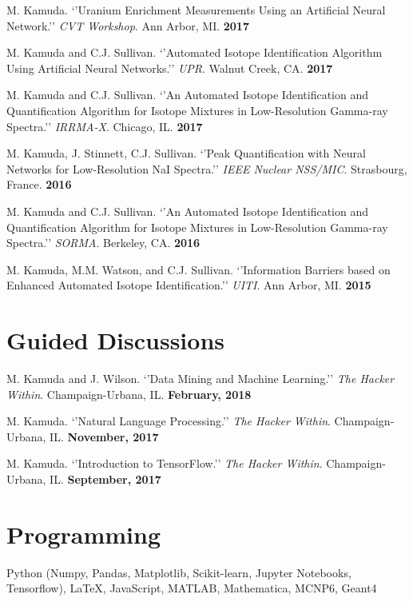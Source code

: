 \documentclass[margin]{res}
\begin{document}
\begin{resume}
M. Kamuda. `'Uranium Enrichment Measurements Using an
Artificial Neural Network.'' \textit{CVT Workshop}. Ann Arbor, MI.  \hfill \textbf{2017}

M. Kamuda and C.J. Sullivan. `'Automated Isotope Identification Algorithm Using Artificial Neural Networks.'' \textit{UPR}. Walnut Creek, CA.  \hfill \textbf{2017}


M. Kamuda and C.J. Sullivan. `'An Automated Isotope Identification and Quantification Algorithm for Isotope Mixtures in Low-Resolution Gamma-ray Spectra.'' \textit{IRRMA-X}. Chicago, IL.  \hfill \textbf{2017}

M. Kamuda, J. Stinnett, C.J. Sullivan. `'Peak Quantification with Neural Networks for Low-Resolution NaI Spectra.'' \textit{IEEE Nuclear NSS/MIC}. Strasbourg, France.  \hfill \textbf{2016}


M. Kamuda and C.J. Sullivan. `'An Automated Isotope Identification and Quantification Algorithm for Isotope Mixtures in Low-Resolution Gamma-ray Spectra.'' \textit{SORMA}. Berkeley, CA.  \hfill \textbf{2016}


M. Kamuda, M.M. Watson, and C.J. Sullivan. `'Information Barriers based on Enhanced Automated Isotope Identification.'' \textit{UITI}. Ann Arbor, MI.  \hfill \textbf{2015}






\section{Guided Discussions}

M. Kamuda and J. Wilson. `'Data Mining and Machine Learning.'' \textit{The Hacker Within}. Champaign-Urbana, IL.  \hfill \textbf{February, 2018}

M. Kamuda. `'Natural Language Processing.'' \textit{The Hacker Within}. Champaign-Urbana, IL.  \hfill \textbf{November, 2017}

M. Kamuda. `'Introduction to TensorFlow.'' \textit{The Hacker Within}. Champaign-Urbana, IL.  \hfill \textbf{September, 2017}


\section{Programming}
Python (Numpy, Pandas, Matplotlib, Scikit-learn, Jupyter Notebooks, Tensorflow), LaTeX, JavaScript, MATLAB, Mathematica, MCNP6, Geant4
 
\end{resume} 
\end{document}
